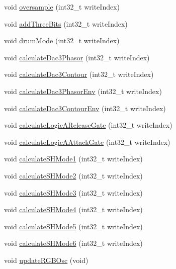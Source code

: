\begin{DoxyCompactItemize}
void \mbox{\hyperlink{class_via_meta_ae7c5b16eb49bbc307f865fa9ffa3791c}{oversample}} (int32\+\_\+t write\+Index)
\item 
void \mbox{\hyperlink{class_via_meta_a3d97e2435f744b283f1f844ad88cb74d}{add\+Three\+Bits}} (int32\+\_\+t write\+Index)
\item 
void \mbox{\hyperlink{class_via_meta_a81c41ff6c7e3b4c0bb24a708755235fb}{drum\+Mode}} (int32\+\_\+t write\+Index)
\item 
void \mbox{\hyperlink{class_via_meta_a52d062ff1d9a7f039c81abd9e75dd91f}{calculate\+Dac3\+Phasor}} (int32\+\_\+t write\+Index)
\item 
void \mbox{\hyperlink{class_via_meta_ac0d39fc0dae1e4b098009bb052aec13c}{calculate\+Dac3\+Contour}} (int32\+\_\+t write\+Index)
\item 
void \mbox{\hyperlink{class_via_meta_a72ca10d0f7265a4afc233993affc6668}{calculate\+Dac3\+Phasor\+Env}} (int32\+\_\+t write\+Index)
\item 
void \mbox{\hyperlink{class_via_meta_a6b8b934f8dfa1e26cf7136e4421a9a80}{calculate\+Dac3\+Contour\+Env}} (int32\+\_\+t write\+Index)
\item 
void \mbox{\hyperlink{class_via_meta_adfca36bfdc46260efc6f6af088eb94c0}{calculate\+Logic\+A\+Release\+Gate}} (int32\+\_\+t write\+Index)
\item 
void \mbox{\hyperlink{class_via_meta_aa5e9f7c2d51880923bf4047aea321506}{calculate\+Logic\+A\+Attack\+Gate}} (int32\+\_\+t write\+Index)
\item 
void \mbox{\hyperlink{class_via_meta_a694368607a40f8a924207599e7722f1b}{calculate\+S\+H\+Mode1}} (int32\+\_\+t write\+Index)
\item 
void \mbox{\hyperlink{class_via_meta_ada3ace55b8b293141aba025e0f5dde74}{calculate\+S\+H\+Mode2}} (int32\+\_\+t write\+Index)
\item 
void \mbox{\hyperlink{class_via_meta_a1efd5183b450d406c611efe6685db2bb}{calculate\+S\+H\+Mode3}} (int32\+\_\+t write\+Index)
\item 
void \mbox{\hyperlink{class_via_meta_a3d42b57263e2d3b81c0f53df54f61eac}{calculate\+S\+H\+Mode4}} (int32\+\_\+t write\+Index)
\item 
void \mbox{\hyperlink{class_via_meta_a8f6cdf15395d9382bd085b14a1207b43}{calculate\+S\+H\+Mode5}} (int32\+\_\+t write\+Index)
\item 
void \mbox{\hyperlink{class_via_meta_ab85c156e41e1382382c09b1bed76caab}{calculate\+S\+H\+Mode6}} (int32\+\_\+t write\+Index)
\item 
void \mbox{\hyperlink{class_via_meta_a46874348486070e614149008c2099943}{update\+R\+G\+B\+Osc}} (void)

\end{DoxyCompactItemize}
